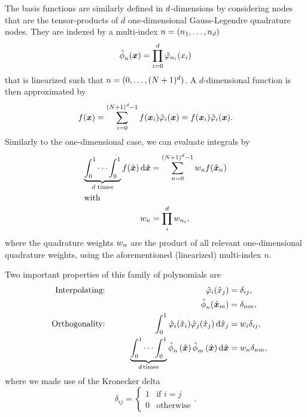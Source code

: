 The basis functions are similarly defined in $\dimensions$-dimensions by considering nodes that are the tensor-products of $d$ one-dimensional Gauss-Legendre quadrature nodes.
They are indexed by a multi-index $n = (n_1, \ldots, n_\dimensions)$
\begin{equation}
  \label{eq:basis-space}
  \sbasisRef[][n] (\bm{x}) = \prod_{i=0}^{\dimensions} \lagrangeRef[n_i] (x_i)
\end{equation}
that is linearized such that $n = (0, \ldots, \sbasisSize)$.
A $d$-dimensional function is then approximated by
\begin{equation}
  \label{eq:lagrange-expansion}
  f(\bm{x}) = \sum_{i = 0}^{\sbasisSize - 1} f(\bm{x}_i) \lagrangeRef[i](\bm{x}) = f(\bm{x}_i) \lagrangeRef[i](\bm{x}).
\end{equation}
Similarly to the one-dimensional case, we can evaluate integrals by
\begin{align}
  \label{eq:quadrature}
  \underbrace{\int_0^1 \cdots \int_0^1}_{\dimensions \text{ times}} f(\hat{\bm{x}}) \dd{\hat{\bm{x}}} &=
 \sum_{n=0}^{\sbasisSize-1} \quadWeight[n] f(\quadNodeNd[n]) \\
  \intertext{with}
  \quadWeight[n] &= \prod_{i}^{d} \quadWeight[n_i],
\end{align}
where the quadrature weights $\quadWeight[n]$ are the product of all relevant one-dimensional quadrature weights, using the aforementioned (linearized) multi-index $n$.

Two important properties of this family of polynomials are
  \begin{alignat}{10}
    \label{eq:basis-interpolating}
&& \text{Interpolating:} \qquad && \lagrangeRef[i] (\quadNode[j]) &= \delta_{ij},\\
&& \qquad && \sbasisRef[][n] (\quadNodeNd[m]) &= \delta_{nm}, \notag\\
\label{eq:basis-orthogonality}
&& \text{Orthogonality:} \qquad && \int_0^1 \lagrangeRef[i](\quadNode[i]) \lagrangeRef[j](\quadNode[j]) \dd{\quadNode[j]} &= \quadWeight[i] \delta_{ij},\\
&& \qquad &&
\underbrace{\int_0^1 \cdots \int_0^1}_{d \,\text{times}}
\sbasisRef[][n] \left( \hat{\bm{x}} \right)
\sbasisRef[][m] \left( \hat{\bm{x}} \right) \dd{\hat{\bm{x}}}
&= \quadWeight[n] \delta_{nm}, \notag
    \end{alignat}
    where we made use of the Kronecker delta
\begin{equation}
      \label{eq:kronecker-delta}
      \delta_{ij} =
      \begin{cases}
        1 & \text{if } i = j\\
        0 & \text{otherwise}
      \end{cases}.
\end{equation}

